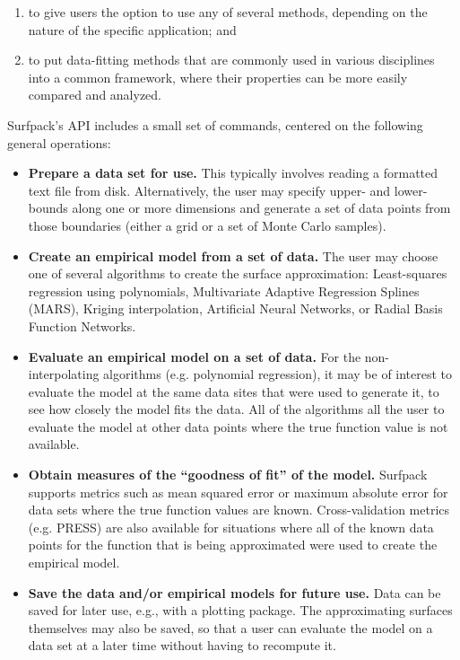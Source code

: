 \documentclass{article}
\begin{document}
\begin{enumerate}
\item to give users the option to use any of several methods, depending on the nature of the specific application; and
\item to put data-fitting methods that are commonly used in various disciplines into a common framework, where their properties can be more easily compared and analyzed.
\end{enumerate}
Surfpack's API includes a small set of commands, centered on the following general operations:
\begin{itemize}
\item {\bf Prepare a data set for use.}  This typically involves reading a formatted text file from disk.  Alternatively, the user may specify upper- and lower-bounds along one or more dimensions and generate a set of data points from those boundaries (either a grid or a set of Monte Carlo samples).
\item {\bf Create an empirical model from a set of data.} The user may choose one of several algorithms to create the surface approximation: Least-squares regression using polynomials, Multivariate Adaptive Regression Splines (MARS), Kriging interpolation, Artificial Neural Networks, or Radial Basis Function Networks.
\item {\bf Evaluate an empirical model on a set of data.}  For the non-interpolating algorithms (e.g. polynomial regression), it may be of interest to evaluate the model at the same data sites that were used to generate it, to see how closely the model fits the data.  All of the algorithms all the user to evaluate the model at other data points where the true function value is not available.
\item {\bf Obtain measures of the ``goodness of fit'' of the model.}  Surfpack supports metrics such as mean squared error or maximum absolute error for data sets where the true function values are known.  Cross-validation metrics (e.g. PRESS) are also available for situations where all of the known data points for the function that is being approximated were used to create the empirical model.
\item {\bf Save the data and/or empirical models for future use.}  Data can be saved for later use, e.g., with a plotting package.  The approximating surfaces themselves may also be saved, so that a user can evaluate the model on a data set at a later time without having to recompute it.
\end{itemize}
\end{document}
